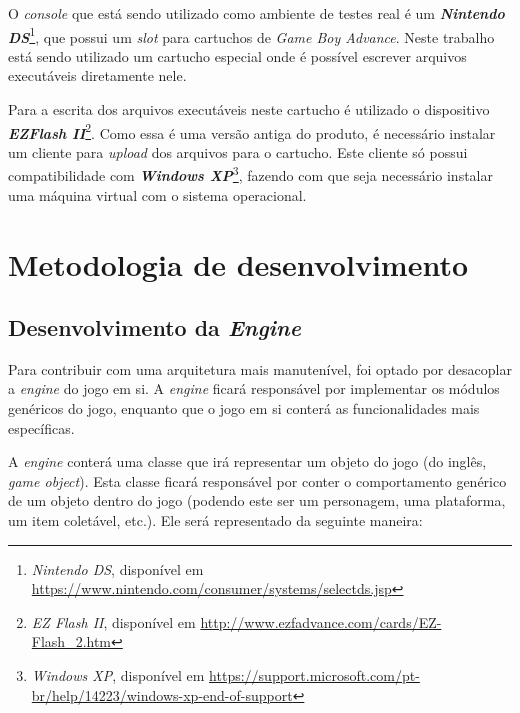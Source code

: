      O \textit {console} que está sendo utilizado como ambiente de testes real é um \textbf{\textit{Nintendo DS}}\footnote{\textit{Nintendo DS}, disponível em \url{https://www.nintendo.com/consumer/systems/selectds.jsp}}, que possui um \textit{slot} para cartuchos de \textit{Game Boy Advance}. Neste trabalho está sendo utilizado um cartucho especial onde é possível escrever arquivos executáveis diretamente nele.

      Para a escrita dos arquivos executáveis neste cartucho é utilizado o dispositivo \textbf{\textit{EZFlash II}}\footnote{\textit{EZ Flash II}, disponível em \url{http://www.ezfadvance.com/cards/EZ-Flash_2.htm}}. Como essa é uma versão antiga do produto, é necessário instalar um cliente para \textit{upload} dos arquivos para o cartucho. Este cliente só possui compatibilidade com \textit{\textbf{Windows XP}}\footnote{\textit{Windows XP}, disponível em \url{https://support.microsoft.com/pt-br/help/14223/windows-xp-end-of-support}}, fazendo com que seja necessário instalar uma máquina virtual com o sistema operacional.

\section{Metodologia de desenvolvimento}

  \subsection{Desenvolvimento da \textit{Engine}}

    Para contribuir com uma arquitetura mais manutenível, foi optado por desacoplar a \textit{engine} do jogo em si. A \textit{engine} ficará responsável por implementar os módulos genéricos do jogo, enquanto que o jogo em si conterá as funcionalidades mais específicas.

    A \textit{engine} conterá uma classe que irá representar um objeto do jogo (do inglês, \textit{game object}). Esta classe ficará responsável por conter o comportamento genérico de um objeto dentro do jogo (podendo este ser um personagem, uma plataforma, um item coletável, etc.). Ele será representado da seguinte maneira:

    \vspace{\onelineskip}

